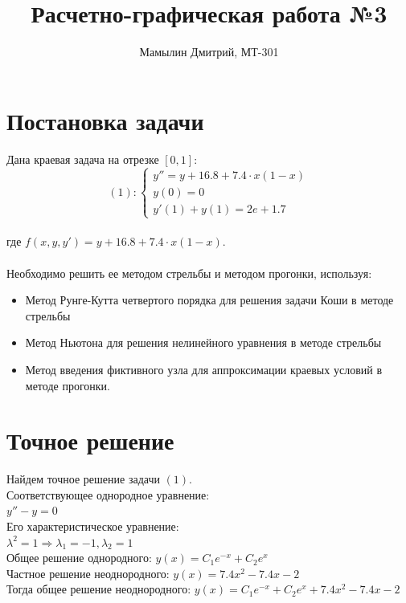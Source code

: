 \documentclass[12pt,a4paper]{article}
\title{Расчетно-графическая работа №3}
\author{Мамылин Дмитрий, МТ-301}
\begin{document}

\maketitle
\thispagestyle{empty}

\newpage
\thispagestyle{empty}

    \section*{Постановка задачи}
        Дана краевая задача на отрезке $[0, 1]$:\\
        \[
        (1):
        \begin{cases}
        	y'' = y + 16.8 + 7.4 \cdot x(1 - x)\\
	    	y(0) = 0\\
     		y'(1) + y(1) = 2e + 1.7
     	\end{cases}
     	\]\\
     	где $f(x, y, y') = y + 16.8 + 7.4 \cdot x(1 - x)$.\\\\
     	
     	\noindent
        Необходимо решить ее методом стрельбы и методом прогонки, используя:\\
        \vspace{-5mm}
        \begin{itemize}
        \setlength\itemsep{-1.5em}
	        \item Метод Рунге-Кутта четвертого порядка для решения задачи Коши в методе стрельбы\\
    	    \item Метод Ньютона для решения нелинейного уравнения в методе стрельбы\\
        	\item Метод введения фиктивного узла для аппроксимации краевых условий в методе прогонки.
        \end{itemize}
        
    \section*{Точное решение}
        Найдем точное решение задачи $(1)$.\\
        Соответствующее однородное уравнение:\\
        $y'' - y = 0$\\
        Его характеристическое уравнение:\\
        $\lambda^{2} = 1 \Rightarrow \lambda_{1} = -1, \lambda_{2} = 1$\\
        Общее решение однородного: $y(x) = C_{1}e^{-x} + C_{2}e^{x}$\\
        Частное решение неоднородного: $y(x) = 7.4x^{2} - 7.4x - 2$\\
        Тогда общее решение неоднородного: $y(x) = C_{1}e^{-x} + C_{2}e^{x} +
        7.4x^{2} - 7.4x - 2$\\\\
        
\end{document}

